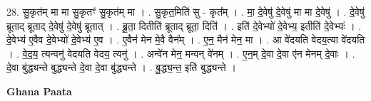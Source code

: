 \documentclass[17pt]{extarticle}
\begin{document}
28. सु॒कृत॑म् मा मा सु॒कृतꣳ॑ सु॒कृत॑म् मा । . सु॒कृत॒मिति॑ सु - कृत᳚म् । . मा॒ दे॒वेषु॑ दे॒वेषु॑ मा मा दे॒वेषु॑ । . दे॒वेषु॑ ब्रूताद् ब्रूताद् दे॒वेषु॑ दे॒वेषु॑ ब्रूतात् । . ब्रू॒ता॒ दितीति॑ ब्रूताद् ब्रूता॒ दिति॑ । . इति॑ दे॒वेभ्यो॑ दे॒वेभ्य॒ इतीति॑ दे॒वेभ्यः॑ । . दे॒वेभ्य॑ ए॒वैव दे॒वेभ्यो॑ दे॒वेभ्य॑ ए॒व । . ए॒वैन॑ मेन मे॒वै वैन᳚म् । . ए॒न॒ मैन॑ मेन॒ मा । . आ वे॑दयति वेदय॒त्या वे॑दयति । . वे॒द॒य॒ त्यन्वनु॑ वेदयति वेदय॒ त्यनु॑ । . अन्वे॑न मेन॒ मन्वन् वे॑नम् । . ए॒न॒म् दे॒वा दे॒वा ए॑न मेनम् दे॒वाः । . दे॒वा बु॑द्ध्यन्ते बुद्ध्यन्ते दे॒वा दे॒वा बु॑द्ध्यन्ते । . बु॒द्ध्य॒न्त॒ इति॑ बुद्ध्यन्ते । \newline

\textbf{Ghana Paata } \newline
\end{document}
